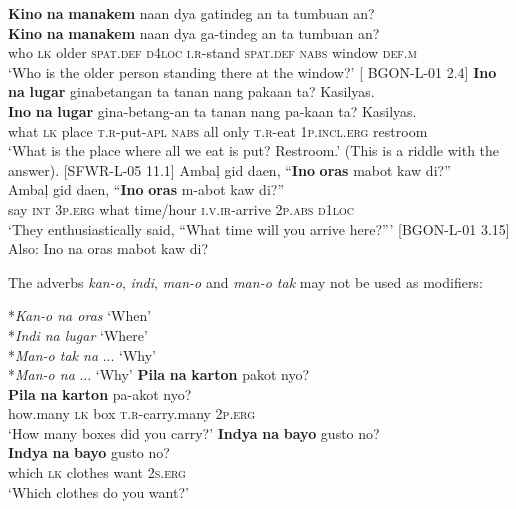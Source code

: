 \ea
\label{bkm:Ref113885505}\label{ex:atthewindow}
\textbf{Kino}  \textbf{na}  \textbf{manakem}  naan  dya  gatindeg  an  ta  tumbuan  an? \\\smallskip
\gll \textbf{Kino}  \textbf{na}  \textbf{manakem}  naan  dya  ga-tindeg  an  ta  tumbuan  an? \\
who  \textsc{lk}  older  \textsc{spat.def}   \textsc{d}4\textsc{loc}  \textsc{i.r}-stand  \textsc{spat.def}  \textsc{nabs}  window  \textsc{def.m} \\
\glt ‘Who is the older person standing there at the window?' [ BGON-L-01 2.4]
\z
\ea
\label{bkm:Ref113885509}\label{ex:restroom}
\textbf{Ino}  \textbf{na}  \textbf{lugar}  ginabetangan  ta  tanan  nang  pakaan  ta?  Kasilyas. \\\smallskip
\gll \textbf{Ino}  \textbf{na}  \textbf{lugar}  gina-betang-an\footnotemark{}  ta  tanan  nang  pa-kaan  ta?  Kasilyas. \\
what  \textsc{lk}  place  \textsc{t.r}-put-\textsc{apl}  \textsc{nabs}  all  only  \textsc{t.r}-eat  1\textsc{p.incl.erg}  restroom \\
\glt ‘What is the place where all we eat is put? Restroom.’ (This is a riddle with the answer). [SFWR-L-05 11.1]
\z
\ea
\label{bkm:Ref113885512}
Ambaļ  gid  daen,  “\textbf{Ino}  \textbf{oras}  mabot  kaw  di?” \\\smallskip
\gll Ambaļ  gid  daen,  “\textbf{Ino}  \textbf{oras}  m-abot  kaw  di?” \\
say  \textsc{int}  3\textsc{p.erg}  what  time/hour  \textsc{i.v.ir}-arrive  2\textsc{p.abs}  \textsc{d}1\textsc{loc} \\
\glt ‘They enthusiastically said, “What time will you arrive here?”' [BGON-L-01 3.15] \\\smallskip
Also: Ino na oras mabot kaw di?
\z

The adverbs \textit{kan-o}, \textit{indi}, \textit{man-o} and \textit{man-o tak} may not be used as modifiers:

\ea
*\textit{Kan-o na oras} ‘When’ \\
*\textit{Indi na lugar} ‘Where’ \\
*\textit{Man-o tak na} ... ‘Why’ \\
*\textit{Man-o na} ... ‘Why’
\z
\ea
\textbf{Pila}  \textbf{na}  \textbf{karton}  pakot  nyo? \\\smallskip
\gll \textbf{Pila}  \textbf{na}  \textbf{karton}  pa-akot  nyo? \\
how.many  \textsc{lk}  box  \textsc{t.r}-carry.many  2\textsc{p.erg} \\
\glt ‘How many boxes did you carry?’
\z
\ea
\textbf{Indya}  \textbf{na}  \textbf{bayo}  gusto  no? \\\smallskip
\gll \textbf{Indya}  \textbf{na}  \textbf{bayo}  gusto  no? \\
which  \textsc{lk}  clothes  want  2\textsc{s.erg} \\
\glt ‘Which clothes do you want?’ \\
\z

